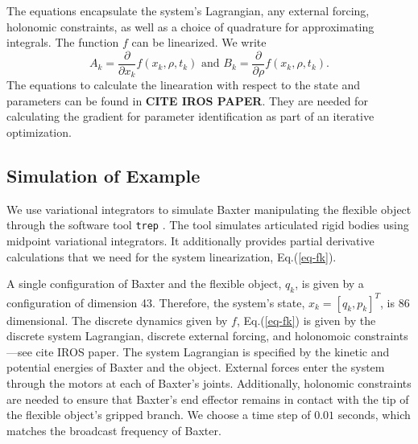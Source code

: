 \documentclass[runningheads,a4paper]{llncs}
\begin{document}
The equations encapsulate the system's Lagrangian, any external forcing, holonomic constraints, as well as a choice of quadrature for approximating integrals.  The function $f$ can be linearized. We write 
\begin{equation}
A_k = \frac{\partial}{\partial x_k}f(x_k,\rho,t_k) \textrm{ and } B_k = \frac{\partial}{\partial \rho}f(x_k,\rho,t_k).
\label{eq-lin_fk}
\end{equation}
The equations to calculate the linearation with respect to the state and parameters can be found in \textbf{CITE IROS PAPER}. They are needed for calculating the gradient for parameter identification as part of an iterative optimization.

\subsection{Simulation of Example}
We use variational integrators to simulate Baxter manipulating the flexible object through the software tool \texttt{trep} \cite{johnson_murphey_scalable}.  The tool simulates articulated rigid bodies using midpoint variational integrators.  It additionally provides partial derivative calculations that we need for the system linearization, Eq.(\ref{eq-fk}). 

A single configuration of Baxter and the flexible object, $q_k$, is given by a configuration of dimension 43. Therefore, the system's state,  $x_k = [q_k,p_k]^T$, is 86 dimensional. The discrete dynamics given by $f$, Eq.(\ref{eq-fk}) is given by the discrete system Lagrangian, discrete external forcing, and holonomoic constraints---see cite IROS paper.  The system Lagrangian is specified by the kinetic and potential energies of Baxter and the object.  External forces enter the system through the motors at each of Baxter's joints.  Additionally, holonomic constraints are needed to ensure that Baxter's end effector remains in contact with the tip of the flexible object's gripped branch.  We choose a time step of $0.01$ seconds, which matches the broadcast frequency of Baxter. 
\end{document}
